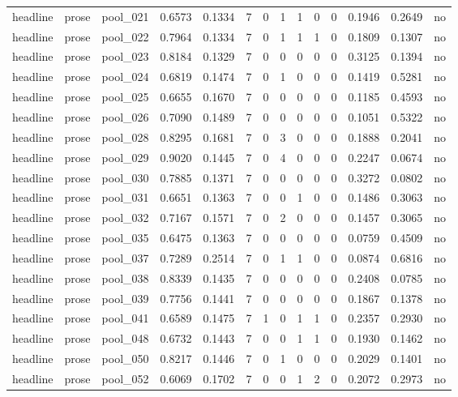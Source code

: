 \begin{table}[t]
{\begin{tabular}{llllllllllllll}
headline & prose & pool\_021 & 0.6573 & 0.1334 & 7 & 0 & 1 & 1 & 0 & 0 & 0.1946 & 0.2649 & no \\
headline & prose & pool\_022 & 0.7964 & 0.1334 & 7 & 0 & 1 & 1 & 1 & 0 & 0.1809 & 0.1307 & no \\
headline & prose & pool\_023 & 0.8184 & 0.1329 & 7 & 0 & 0 & 0 & 0 & 0 & 0.3125 & 0.1394 & no \\
headline & prose & pool\_024 & 0.6819 & 0.1474 & 7 & 0 & 1 & 0 & 0 & 0 & 0.1419 & 0.5281 & no \\
headline & prose & pool\_025 & 0.6655 & 0.1670 & 7 & 0 & 0 & 0 & 0 & 0 & 0.1185 & 0.4593 & no \\
headline & prose & pool\_026 & 0.7090 & 0.1489 & 7 & 0 & 0 & 0 & 0 & 0 & 0.1051 & 0.5322 & no \\
headline & prose & pool\_028 & 0.8295 & 0.1681 & 7 & 0 & 3 & 0 & 0 & 0 & 0.1888 & 0.2041 & no \\
headline & prose & pool\_029 & 0.9020 & 0.1445 & 7 & 0 & 4 & 0 & 0 & 0 & 0.2247 & 0.0674 & no \\
headline & prose & pool\_030 & 0.7885 & 0.1371 & 7 & 0 & 0 & 0 & 0 & 0 & 0.3272 & 0.0802 & no \\
headline & prose & pool\_031 & 0.6651 & 0.1363 & 7 & 0 & 0 & 1 & 0 & 0 & 0.1486 & 0.3063 & no \\
headline & prose & pool\_032 & 0.7167 & 0.1571 & 7 & 0 & 2 & 0 & 0 & 0 & 0.1457 & 0.3065 & no \\
headline & prose & pool\_035 & 0.6475 & 0.1363 & 7 & 0 & 0 & 0 & 0 & 0 & 0.0759 & 0.4509 & no \\
headline & prose & pool\_037 & 0.7289 & 0.2514 & 7 & 0 & 1 & 1 & 0 & 0 & 0.0874 & 0.6816 & no \\
headline & prose & pool\_038 & 0.8339 & 0.1435 & 7 & 0 & 0 & 0 & 0 & 0 & 0.2408 & 0.0785 & no \\
headline & prose & pool\_039 & 0.7756 & 0.1441 & 7 & 0 & 0 & 0 & 0 & 0 & 0.1867 & 0.1378 & no \\
headline & prose & pool\_041 & 0.6589 & 0.1475 & 7 & 1 & 0 & 1 & 1 & 0 & 0.2357 & 0.2930 & no \\
headline & prose & pool\_048 & 0.6732 & 0.1443 & 7 & 0 & 0 & 1 & 1 & 0 & 0.1930 & 0.1462 & no \\
headline & prose & pool\_050 & 0.8217 & 0.1446 & 7 & 0 & 1 & 0 & 0 & 0 & 0.2029 & 0.1401 & no \\
headline & prose & pool\_052 & 0.6069 & 0.1702 & 7 & 0 & 0 & 1 & 2 & 0 & 0.2072 & 0.2973 & no \\

\end{tabular}}
\end{table}
